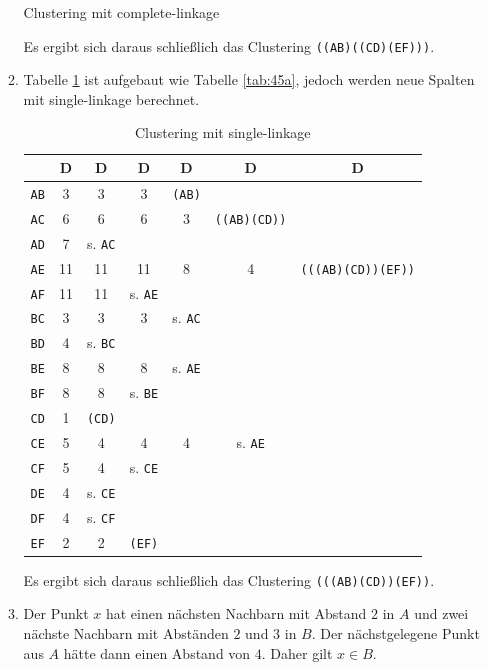 \documentclass{homework}
\begin{document}
\begin{enumerate}
\begin{enumerate}
\begin{table}
\caption{Clustering mit complete-linkage}
\label{tab:45a}
\end{table}

Es ergibt sich daraus schließlich das Clustering \texttt{((AB)((CD)(EF)))}.

\item
Tabelle \ref{tab:45b} ist aufgebaut wie Tabelle \ref{tab:45a}, jedoch werden neue Spalten mit single-linkage berechnet.

\begin{table}
\centering
\begin{tabular}{|c|cccccc|}
\hline
 	& D & D & D & D & D & D\\\hline\hline
\texttt{AB}	& 3		& 3		& 3		& \texttt{(AB)}	& 		& \\
\texttt{AC}	& 6		& 6		& 6		& 3		& \texttt{((AB)(CD))}	& \\
\texttt{AD}	& 7		& s. \texttt{AC}	& 		& 		& 		& \\
\texttt{AE}	& 11	& 11	& 11	& 8		& 4		& \texttt{(((AB)(CD))(EF))}\\
\texttt{AF}	& 11	& 11	& s. \texttt{AE}	& 		& 		& \\
\texttt{BC}	& 3		& 3		& 3		& s. \texttt{AC}	& 		& \\
\texttt{BD}	& 4		& s. \texttt{BC}	& 		& 		& 		& \\
\texttt{BE}	& 8		& 8		& 8		& s. \texttt{AE}	& 		& \\
\texttt{BF}	& 8		& 8		& s. \texttt{BE}	& 		& 		& \\
\texttt{CD}	& 1		& \texttt{(CD)}	& 		& 		& 		& \\
\texttt{CE}	& 5		& 4		& 4		& 4		& s. \texttt{AE}	& \\
\texttt{CF}	& 5		& 4		& s. \texttt{CE}	& 		& 		& \\
\texttt{DE}	& 4		& s. \texttt{CE}	& 		& 		& 		& \\
\texttt{DF}	& 4		& s. \texttt{CF}	& 		& 		& 		& \\
\texttt{EF}	& 2		& 2		& \texttt{(EF)}	& 		& 		& \\
\hline
\end{tabular}

\caption{Clustering mit single-linkage}
\label{tab:45b}
\end{table}

Es ergibt sich daraus schließlich das Clustering \texttt{(((AB)(CD))(EF))}.

\item Der Punkt $x$ hat einen nächsten Nachbarn mit Abstand $2$ in $A$ und zwei nächste Nachbarn mit Abständen $2$ und $3$ in $B$.
Der nächstgelegene Punkt aus $A$ hätte dann einen Abstand von $4$. Daher gilt $x \in B$.
\end{enumerate}

\end{enumerate}
\end{document}
